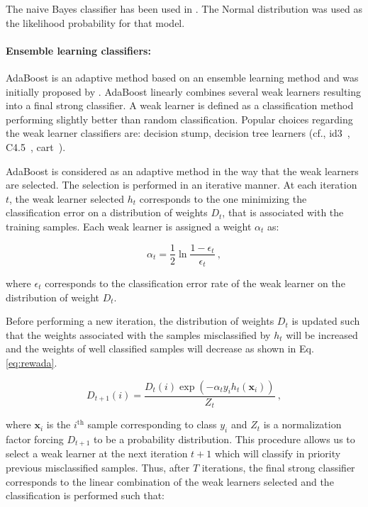 The naive Bayes classifier has been used in \cite{Giannini2013,Mazzetti2011,Niaf2011,Niaf2012}.
The Normal distribution was used as the likelihood probability for that model.


\paragraph{Ensemble learning classifiers:}
AdaBoost is an adaptive method based on an ensemble learning method and was initially proposed by \cite{Freund1997}. 
AdaBoost linearly combines several weak learners resulting into a final strong classifier.
A weak learner is defined as a classification method performing slightly better than random classification.
Popular choices regarding the weak learner classifiers are: decision stump, decision tree learners (cf., \ac{id3}~\cite{Quinlan1986}, C4.5~\cite{Quinlan1993}, \ac{cart}~\cite{Breiman1984}).

AdaBoost is considered as an adaptive method in the way that the weak learners are selected. The selection is performed in an iterative manner. At each iteration $t$, the weak learner selected $h_t$ corresponds to the one minimizing the classification error on a distribution of weights $D_t$, that is associated with the training samples. Each weak learner is assigned a weight $\alpha_t$ as:

\begin{equation}
	\alpha_t = \frac{1}{2} \ln \frac{1 - \epsilon_t}{\epsilon_t} \ ,
	\label{eq:wclssada}
\end{equation}

\noindent where $\epsilon_t$ corresponds to the classification error rate of the weak learner on the distribution of weight $D_t$.

Before performing a new iteration, the distribution of weights $D_t$ is updated such that the weights associated with the samples misclassified by $h_t$ will be increased and the weights of well classified samples will decrease as shown in Eq. \eqref{eq:rewada}.

\begin{equation}
	D_{t+1}(i) = \frac{ D_t(i) \exp \left( -\alpha_t y_i h_{t}(\mathbf{x}_{i} ) \right) }{ Z_t  } \ ,
	\label{eq:rewada} 
\end{equation}

\noindent where $\mathbf{x}_i$ is the $i^{\text{th}}$ sample corresponding to class $y_i$ and $Z_t$ is a normalization factor forcing $D_{t+1}$ to be a probability distribution. 
This procedure allows us to select a weak learner at the next iteration $t+1$ which will classify in priority previous misclassified samples. 
Thus, after $T$ iterations, the final strong classifier corresponds to the linear combination of the weak learners selected and the classification is performed such that:

